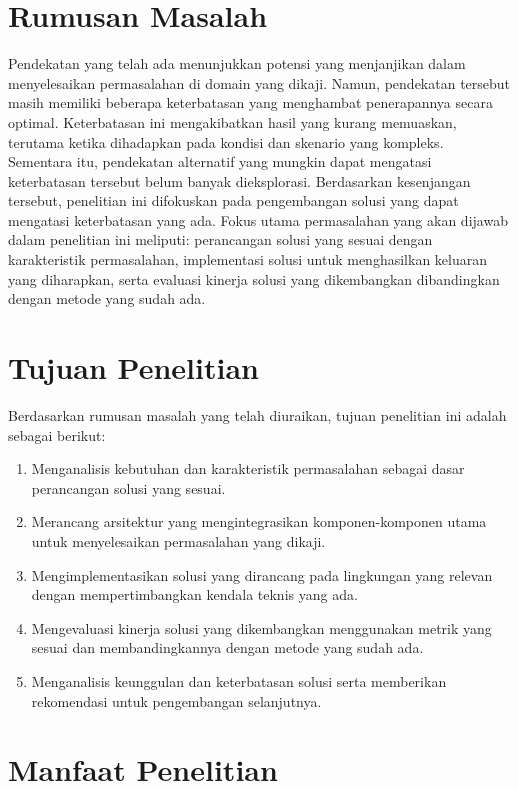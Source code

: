 \section{Rumusan Masalah}

Pendekatan yang telah ada menunjukkan potensi yang menjanjikan dalam menyelesaikan permasalahan di domain yang dikaji. Namun, pendekatan tersebut masih memiliki beberapa keterbatasan yang menghambat penerapannya secara optimal. Keterbatasan ini mengakibatkan hasil yang kurang memuaskan, terutama ketika dihadapkan pada kondisi dan skenario yang kompleks. Sementara itu, pendekatan alternatif yang mungkin dapat mengatasi keterbatasan tersebut belum banyak dieksplorasi. Berdasarkan kesenjangan tersebut, penelitian ini difokuskan pada pengembangan solusi yang dapat mengatasi keterbatasan yang ada. Fokus utama permasalahan yang akan dijawab dalam penelitian ini meliputi: perancangan solusi yang sesuai dengan karakteristik permasalahan, implementasi solusi untuk menghasilkan keluaran yang diharapkan, serta evaluasi kinerja solusi yang dikembangkan dibandingkan dengan metode yang sudah ada.

\section{Tujuan Penelitian}

Berdasarkan rumusan masalah yang telah diuraikan, tujuan penelitian ini adalah sebagai berikut:
\begin{enumerate}
  \item Menganalisis kebutuhan dan karakteristik permasalahan sebagai dasar perancangan solusi yang sesuai.
  \item Merancang arsitektur yang mengintegrasikan komponen-komponen utama untuk menyelesaikan permasalahan yang dikaji.
  \item Mengimplementasikan solusi yang dirancang pada lingkungan yang relevan dengan mempertimbangkan kendala teknis yang ada.
  \item Mengevaluasi kinerja solusi yang dikembangkan menggunakan metrik yang sesuai dan membandingkannya dengan metode yang sudah ada.
  \item Menganalisis keunggulan dan keterbatasan solusi serta memberikan rekomendasi untuk pengembangan selanjutnya.
\end{enumerate}

\section{Manfaat Penelitian}

